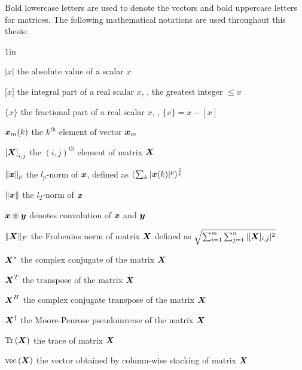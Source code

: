 \noindent Bold lowercase letters are used to denote the vectors and bold uppercase letters for matrices. The following mathematical notations are used throughout this thesis:
\begin{list}
{}
{\setlength
   {}{1in}
    \setlength{\leftmargin}{1.5in}
    \setlength{\labelsep}{.5in}}
	
	\item[$|x|$\hfill] the absolute value of a scalar $x$
	
	\item[${[}x{]}$\hfill] the integral part of a real scalar $x$, \ie, the greatest integer $\leq x$
	
	\item[$\{x\}$\hfill] the fractional part of a real scalar $x$, \ie, $\{x\}=x-[x]$
	
	\item[$\boldsymbol{x}_m(k)$\hfill] the $k^\text{th}$ element of vector $\boldsymbol{x}_m$
	
	\item[${[}\boldsymbol{X}{]}_{i,j}$\hfill] the $(i,j)^\text{th}$ element of matrix $\boldsymbol{X}$
	
	\item[$\|\boldsymbol{x}\|_p$\hfill] the $l_p$-norm of $\boldsymbol{x}$, defined as $\left(\sum_k{|\boldsymbol{x}(k)|^p}\right)^{\frac{1}{p}}$
	
	\item[$\|\boldsymbol{x}\|$\hfill] the $l_2$-norm of $\boldsymbol{x}$
	
	\item[$\boldsymbol{x} \circledast \boldsymbol{y}$\hfill] denotes convolution of $\boldsymbol{x}$ and $\boldsymbol{y}$
	
	\item[$\|\boldsymbol{X}\|_F$\hfill] the Frobenius norm of matrix $\boldsymbol{X}$ defined as $\sqrt{\sum_{i=1}^{m}{\sum_{j=1}^{n}{|[\boldsymbol{X}]_{i,j}|^2}}}$
	
	\item[$\boldsymbol{X}^*$\hfill] the complex conjugate of the matrix $\boldsymbol{X}$
	
	\item[$\boldsymbol{X}^T$\hfill] the transpose of the matrix $\boldsymbol{X}$
	
	\item[$\boldsymbol{X}^H$\hfill] the complex conjugate transpose of the matrix $\boldsymbol{X}$
	
	\item[$\boldsymbol{X}^\dagger$\hfill] the Moore-Penrose pseudoinverse of the matrix $\boldsymbol{X}$
	
	\item[$\mathrm{Tr}\left(\boldsymbol{X}\right)$\hfill] the trace of matrix $\boldsymbol{X}$
	
	\item[$\mathrm{vec}\left(\boldsymbol{X}\right)$\hfill] the vector obtained by column-wise stacking of matrix $\boldsymbol{X}$
	

\end{list}

